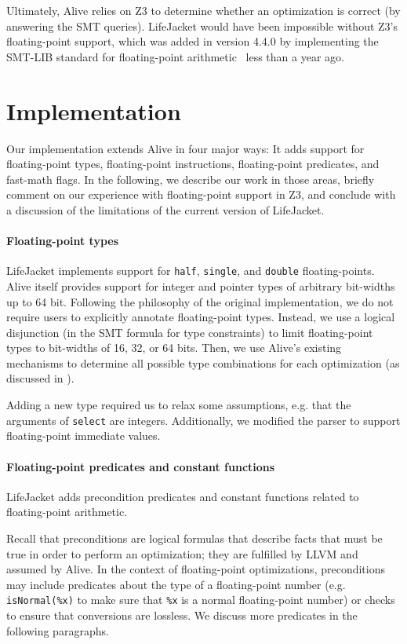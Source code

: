 \documentclass[preprint, numbers]{sigplanconf}
\newcommand{\xxx}{LifeJacket}
\begin{document}
Ultimately, Alive relies on Z3 to determine whether an optimization is correct
(by answering the SMT queries). \xxx{} would have been impossible without Z3's
floating-point support, which was added in version 4.4.0 by implementing the
SMT-LIB standard for floating-point arithmetic~\cite{smtFPA2010} less than a
year ago.



\section{Implementation} \label{sec:implementation}
Our implementation extends Alive in four major ways: It adds support for
floating-point types, floating-point instructions, floating-point predicates,
and fast-math flags. In the following, we describe our work in those areas,
briefly comment on our experience with floating-point support in Z3, and
conclude with a discussion of the limitations of the current version of \xxx{}.

\paragraph{Floating-point types}
\xxx{} implements support for \texttt{half}, \texttt{single}, and
\texttt{double} floating-points.
Alive itself provides support for integer and pointer types of arbitrary
bit-widths up to 64 bit. Following the philosophy of the original implementation,
we do not require users to explicitly annotate floating-point types. Instead,
we use a logical disjunction (in the SMT formula for type constraints)
to limit floating-point types to bit-widths of 16, 32, or 64 bits. Then, we use
Alive's existing mechanisms to determine all possible type combinations for each
optimization (as discussed in ). 

Adding a new type required us to relax some assumptions, e.g. that the
arguments of \texttt{select} are integers. Additionally, we modified the parser
to support floating-point immediate values.

\paragraph{Floating-point predicates and constant functions} \xxx{} adds
precondition predicates and constant functions related to floating-point
arithmetic.

Recall that preconditions are logical formulas that describe facts that must be
true in order to perform an optimization; they are fulfilled by LLVM and
assumed by Alive. In the context of floating-point optimizations, preconditions
may include predicates about the type of a floating-point number (e.g.
\texttt{isNormal(\%x)} to make sure that \texttt{\%x} is a normal
floating-point number) or checks to ensure that conversions are lossless. We
discuss more predicates in the following paragraphs.
\end{document}
